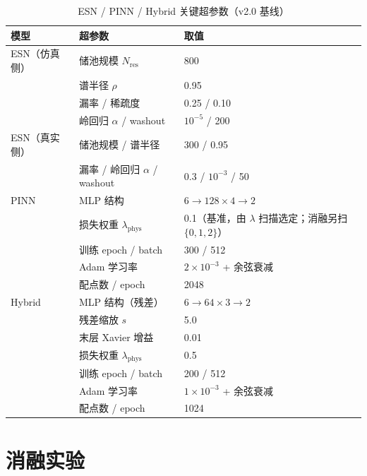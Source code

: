 \documentclass[a4paper,12pt]{ctexart}   %
\begin{document}
\begin{table}[h]
\centering
\caption{ESN / PINN / Hybrid 关键超参数（v2.0 基线）}
\begin{tabular}{ll p{6.2cm}}
\toprule
模型 & 超参数 & 取值 \\
\midrule
ESN（仿真侧） & 储池规模 $N_{\mathrm{res}}$            & 800 \\
       & 谱半径 $\rho$                          & 0.95 \\
       & 漏率 / 稀疏度                     & 0.25 / 0.10 \\
       & 岭回归 $\alpha$ / washout              & $10^{-5}$ / 200 \\
\midrule
ESN（真实侧） & 储池规模 / 谱半径              & 300 / 0.95 \\
       & 漏率 / 岭回归 $\alpha$ / washout       & 0.3 / $10^{-3}$ / 50 \\
\midrule
PINN   & MLP 结构                                & $6 \to 128 \times 4 \to 2$ \\
       & 损失权重 $\lambda_{\mathrm{phys}}$     & 0.1（基准，由 $\lambda$ 扫描选定；消融另扫 $\{0,1,2\}$）\\
       & 训练 epoch / batch                      & 300 / 512 \\
       & Adam 学习率                             & $2 \times 10^{-3}$ + 余弦衰减 \\
       & 配点数 / epoch               & 2048 \\
\midrule
Hybrid & MLP 结构（残差）                        & $6 \to 64 \times 3 \to 2$ \\
       & 残差缩放 $s$                            & 5.0 \\
       & 末层 Xavier 增益                        & 0.01 \\
       & 损失权重 $\lambda_{\mathrm{phys}}$      & 0.5 \\
       & 训练 epoch / batch                      & 200 / 512 \\
       & Adam 学习率                             & $1 \times 10^{-3}$ + 余弦衰减 \\
       & 配点数 / epoch                          & 1024 \\
\bottomrule
\end{tabular}
\end{table}

\section{消融实验}
\label{sec:appendix-ablation}
\end{document}
